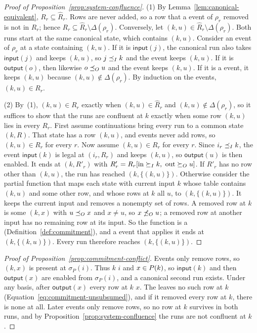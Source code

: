 \begin{proof}[Proof of Proposition~\ref{prop:system-confluence}]
(1) By Lemma~\ref{lem:canonical-equivalent}, $R_r\subseteq\widehat R_r$.
Rows are never added, so a row that a \commitment event of $\rho_r$ removed is
not in $R_r$; hence $R_r\subseteq\widehat R_r\setminus\Delta(\rho_r)$.
Conversely, let $(k,u)\in\widehat R_r\setminus\Delta(\rho_r)$.  Both runs
start at the same canonical state, which contains $(k,u)$.  Consider an event of
$\rho_r$ at a state containing $(k,u)$.  If it is $\mathsf{input}(j)$, the
canonical run also takes $\mathsf{input}(j)$ and keeps $(k,u)$, so
$j\preceq_I k$ and the event keeps $(k,u)$.  If it is $\mathsf{output}(o)$,
then likewise $o\preceq_O u$ and the event keeps $(k,u)$.  If it is a
\commitment event, it keeps $(k,u)$ because $(k,u)\notin\Delta(\rho_r)$.  By
induction on the events, $(k,u)\in R_r$.

(2) By~(1), $(k,u)\in R_r$ exactly when $(k,u)\in\widehat R_r$ and
$(k,u)\notin\Delta(\rho_r)$, so it suffices to show that the runs are confluent
at $k$ exactly when some row $(k,u)$ lies in every $R_r$.  First assume
continuations bring every run to a common state $(k,R)$.  That state has a row
$(k,u)$, and events never add rows, so $(k,u)\in R_r$ for every $r$.  Now
assume $(k,u)\in R_r$ for every $r$.  Since $i_r\preceq_I k$, the event
$\mathsf{input}(k)$ is legal at $(i_r,R_r)$ and keeps $(k,u)$, so
$\mathsf{output}(u)$ is then enabled.  It ends at $(k,R'_r)$ with
$R'_r=R_r[\mathrm{in}\InputGe k,\ \mathrm{out}\OutputGe u]$.  If $R'_r$ has no
row other than $(k,u)$, the run has reached $(k,\{(k,u)\})$.  Otherwise
consider the partial function that maps each state with current input $k$
whose table contains $(k,u)$ and some other row, and whose rows at $k$ all
\outrelbase $u$, to $(k,\{(k,u)\})$.  It keeps the current input and removes a
nonempty set of rows.  A removed row at $k$ is some $(k,x)$ with
$u\preceq_O x$ and $x\neq u$, so $x\not\preceq_O u$; a removed row at
another input has no remaining row at its input.  So the function is a
\commitment (Definition~\ref{def:commitment}), and a \commitment event that
applies it ends at $(k,\{(k,u)\})$.  Every run therefore reaches
$(k,\{(k,u)\})$.
\end{proof}

\begin{proof}[Proof of Proposition~\ref{prop:commitment-conflict}]
Events only remove rows, so $(k,x)$ is present at $\sigma_P(i)$.  Thus $k$
\inrel $i$ and $x\in P(k)$, so $\mathsf{input}(k)$ and then
$\mathsf{output}(x)$ are enabled from $\sigma_P(i)$, and a canonical second
run exists.  Under any basis, after $\mathsf{output}(x)$ every row at $k$
\outrel $x$.  The \commitment leaves no such row at $k$
(Equation~\ref{eq:commitment-unsubsumed}), and if it removed every row at $k$,
there is none at all.  Later events only remove rows, so no row at $k$
survives in both runs, and by Proposition~\ref{prop:system-confluence} the
runs are not confluent at $k$.
\end{proof}

